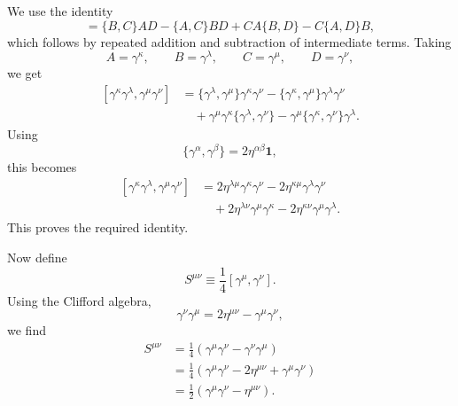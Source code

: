 \documentclass{article}
\begin{document}
We use the identity
\begin{equation}
    [AB,CD]
    =
    \{B,C\}AD
    -
    \{A,C\}BD
    +
    C A\{B,D\}
    -
    C\{A,D\}B ,
\end{equation}
which follows by repeated addition and subtraction of intermediate terms. Taking
\begin{equation}
    A=\gamma^\kappa,
    \qquad
    B=\gamma^\lambda,
    \qquad
    C=\gamma^\mu,
    \qquad
    D=\gamma^\nu,
\end{equation}
we get
\begin{equation}
\begin{split}
    [\gamma^\kappa\gamma^\lambda,\gamma^\mu\gamma^\nu]
    &=
    \{\gamma^\lambda,\gamma^\mu\}\gamma^\kappa\gamma^\nu
    -
    \{\gamma^\kappa,\gamma^\mu\}\gamma^\lambda\gamma^\nu
    \\
    &\quad+
    \gamma^\mu\gamma^\kappa\{\gamma^\lambda,\gamma^\nu\}
    -
    \gamma^\mu\{\gamma^\kappa,\gamma^\nu\}\gamma^\lambda .
\end{split}
\end{equation}
Using
\begin{equation}
    \{\gamma^\alpha,\gamma^\beta\}
    =
    2\eta^{\alpha\beta}\mathbf 1,
\end{equation}
this becomes
\begin{equation}
\begin{split}
    [\gamma^\kappa\gamma^\lambda,\gamma^\mu\gamma^\nu]
    &=
    2\eta^{\lambda\mu}\gamma^\kappa\gamma^\nu
    -
    2\eta^{\kappa\mu}\gamma^\lambda\gamma^\nu
    \\
    &\quad+
    2\eta^{\lambda\nu}\gamma^\mu\gamma^\kappa
    -
    2\eta^{\kappa\nu}\gamma^\mu\gamma^\lambda .
\end{split}
\end{equation}
This proves the required identity.

Now define
\begin{equation}
    S^{\mu\nu}
    \equiv
    \frac14[\gamma^\mu,\gamma^\nu].
\end{equation}
Using the Clifford algebra,
\begin{equation}
    \gamma^\nu\gamma^\mu
    =
    2\eta^{\mu\nu}-\gamma^\mu\gamma^\nu,
\end{equation}
we find
\begin{equation}
\begin{split}
    S^{\mu\nu}
    &=
    \frac14
    \left(
        \gamma^\mu\gamma^\nu
        -
        \gamma^\nu\gamma^\mu
    \right)
    \\
    &=
    \frac14
    \left(
        \gamma^\mu\gamma^\nu
        -
        2\eta^{\mu\nu}
        +
        \gamma^\mu\gamma^\nu
    \right)
    \\
    &=
    \frac12
    \left(
        \gamma^\mu\gamma^\nu-\eta^{\mu\nu}
    \right).
\end{split}
\end{equation}
\end{document}

